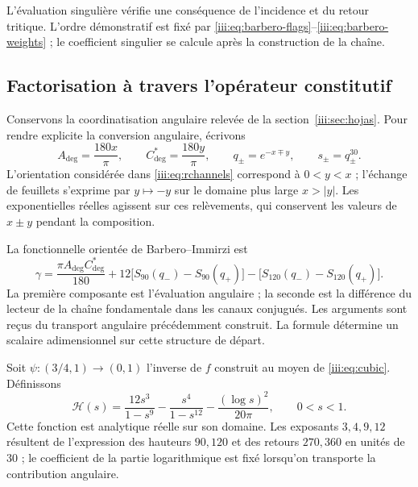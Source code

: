 L’évaluation singulière vérifie une conséquence de l’incidence et du
retour tritique. L’ordre démonstratif est fixé par
\eqref{iii:eq:barbero-flags}--\eqref{iii:eq:barbero-weights} ; le
coefficient singulier se calcule après la construction de la chaîne.

\subsection{Factorisation à travers l’opérateur constitutif}

Conservons la coordinatisation angulaire relevée de la
section~\ref{iii:sec:hojas}. Pour rendre explicite la conversion angulaire,
écrivons
\begin{equation}
 A_{\deg}=\frac{180x}{\pi},\qquad
 C^*_{\deg}=\frac{180y}{\pi},\qquad
 q_\pm=e^{-x\mp y},\qquad s_\pm=q_\pm^{30}.
 \label{iii:eq:barbero-angular-lift}
\end{equation}
L’orientation considérée dans \eqref{iii:eq:rchannels} correspond à
$0<y<x$ ; l’échange de feuillets s’exprime par $y\mapsto-y$ sur le
domaine plus large $x>|y|$. Les exponentielles réelles agissent sur ces
relèvements, qui conservent les valeurs de $x\pm y$ pendant la
composition.

La fonctionnelle orientée de Barbero--Immirzi est
\begin{equation}
 \gamma=\frac{\pi A_{\deg}C^*_{\deg}}{180}
   +12\bigl[S_{90}(q_-)-S_{90}(q_+)\bigr]
   -\bigl[S_{120}(q_-)-S_{120}(q_+)\bigr].
 \label{iii:eq:barbero-functional}
\end{equation}
La première composante est l’évaluation angulaire ; la seconde est la
différence du lecteur de la chaîne fondamentale dans les canaux conjugués.
Les arguments sont reçus du transport angulaire précédemment construit.
La formule détermine un scalaire adimensionnel sur cette structure de
départ.

Soit $\psi:(3/4,1)\to(0,1)$ l’inverse de $f$ construit au moyen de
\eqref{iii:eq:cubic}. Définissons
\begin{equation}
 \mathcal H(s)=\frac{12s^3}{1-s^9}
             -\frac{s^4}{1-s^{12}}
             -\frac{(\log s)^2}{20\pi},\qquad 0<s<1.
 \label{iii:eq:barbero-h}
\end{equation}
Cette fonction est analytique réelle sur son domaine. Les exposants $3,4,9,12$
résultent de l’expression des hauteurs $90,120$ et des retours $270,360$ en
unités de $30$ ; le coefficient de la partie logarithmique est fixé lorsqu’on
transporte la contribution angulaire.

